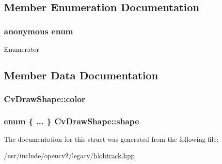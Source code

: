 \subsection{Member Enumeration Documentation}
\hypertarget{structCvDrawShape_a5f5db6b407a0bc774d2e0612a26961b0}{\subsubsection[{anonymous enum}]{\setlength{\rightskip}{0pt plus 5cm}anonymous enum}}\label{structCvDrawShape_a5f5db6b407a0bc774d2e0612a26961b0}
\begin{Desc}
\item[Enumerator]\par
\begin{description}
\item[{\em 
\hypertarget{structCvDrawShape_a5f5db6b407a0bc774d2e0612a26961b0ac7336667b154f3c1a84ae7edccd75566}{R\-E\-C\-T}\label{structCvDrawShape_a5f5db6b407a0bc774d2e0612a26961b0ac7336667b154f3c1a84ae7edccd75566}
}]\item[{\em 
\hypertarget{structCvDrawShape_a5f5db6b407a0bc774d2e0612a26961b0a3fbfe28967315ca06669d4894b92c1e7}{E\-L\-L\-I\-P\-S\-E}\label{structCvDrawShape_a5f5db6b407a0bc774d2e0612a26961b0a3fbfe28967315ca06669d4894b92c1e7}
}]\end{description}
\end{Desc}


\subsection{Member Data Documentation}
\hypertarget{structCvDrawShape_a84c962f52506913e9f1b30878bad2cd4}{
\subsubsection[{color}]{ Cv\-Draw\-Shape\-::color}}\label{structCvDrawShape_a84c962f52506913e9f1b30878bad2cd4}
\hypertarget{structCvDrawShape_a1b681fbdef628df26c976392b3c1421a}{
\subsubsection[{shape}]{\setlength{\rightskip}{0pt plus 5cm}enum \{ ... \}   Cv\-Draw\-Shape\-::shape}}\label{structCvDrawShape_a1b681fbdef628df26c976392b3c1421a}


The documentation for this struct was generated from the following file\-:\begin{DoxyCompactItemize}
\item 
/usr/include/opencv2/legacy/\hyperlink{blobtrack_8hpp}{blobtrack.\-hpp}\end{DoxyCompactItemize}
